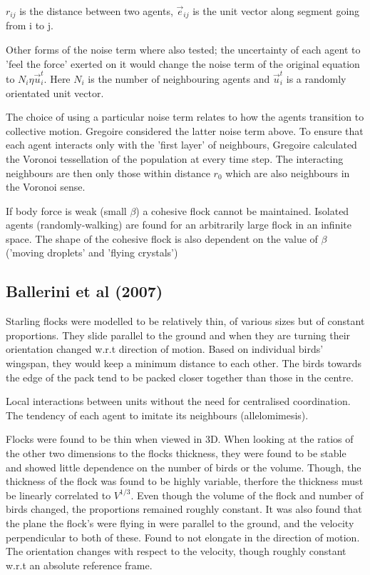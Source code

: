 \documentclass[10pt,twocolumn]{revtex4-2}    %
\begin{document}
$r_{ij}$ is the distance between two agents, $\vec{e}_{ij}$ is the unit vector along segment going from i to j.

Other forms of the noise term where also tested; the uncertainty of each agent to 'feel the force' exerted on it would change the noise term of the original equation to $N_i \eta \vec{u}_i^t$. Here $N_i$ is the number of neighbouring agents and $\vec{u}_i^t$ is a randomly orientated unit vector. 

The choice of using a particular noise term relates to how the agents transition to collective motion. Gregoire considered the latter noise term above. To ensure that each agent interacts only with the 'first layer' of neighbours, Gregoire calculated the Voronoi tessellation of the population at every time step. The interacting neighbours are then only those within distance $r_0$ which are also neighbours in the Voronoi sense. 

If body force is weak (small $\beta$) a cohesive flock cannot be maintained. Isolated agents (randomly-walking) are found for an arbitrarily large flock in an infinite space. The shape of the cohesive flock is also dependent on the value of $\beta$ ('moving droplets' and 'flying crystals')


\subsection{Ballerini et al (2007)}

Starling flocks were modelled to be relatively thin, of various sizes but of constant proportions. They slide parallel to the ground and when they are turning their orientation changed w.r.t direction of motion. Based on individual birds' wingspan, they would keep a minimum distance to each other. The birds towards the edge of the pack tend to be packed closer together than those in the centre. 

Local interactions between units without the need for centralised coordination. The tendency of each agent to imitate its neighbours (allelomimesis).

Flocks were found to be thin when viewed in 3D. When looking at the ratios of the other two dimensions to the flocks thickness, they were found to be stable and showed little dependence on the number of birds or the volume. Though, the thickness of the flock was found to be highly variable, therfore the thickness must be linearly correlated to $V^{1/3}$. Even though the volume of the flock and number of birds changed, the proportions remained roughly constant. It was also found that the plane the flock's were flying in were parallel to the ground, and the velocity perpendicular to both of these. Found to not elongate in the direction of motion. The orientation changes with respect to the velocity, though roughly constant w.r.t an absolute reference frame.
\end{document}

